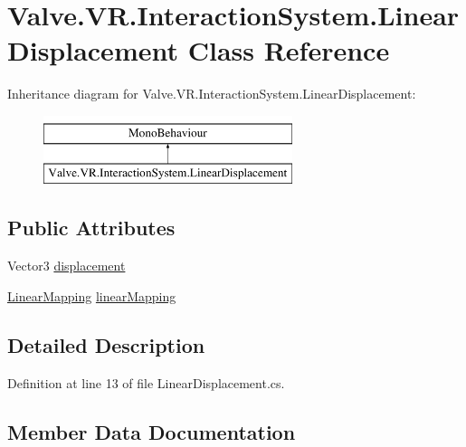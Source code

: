 \hypertarget{class_valve_1_1_v_r_1_1_interaction_system_1_1_linear_displacement}{}\section{Valve.\+V\+R.\+Interaction\+System.\+Linear\+Displacement Class Reference}
\label{class_valve_1_1_v_r_1_1_interaction_system_1_1_linear_displacement}
Inheritance diagram for Valve.\+V\+R.\+Interaction\+System.\+Linear\+Displacement\+:\begin{figure}[H]
\begin{center}
\leavevmode
\includegraphics[height=2.000000cm]{class_valve_1_1_v_r_1_1_interaction_system_1_1_linear_displacement}
\end{center}
\end{figure}
\subsection*{Public Attributes}
\begin{DoxyCompactItemize}
\item 
Vector3 \mbox{\hyperlink{class_valve_1_1_v_r_1_1_interaction_system_1_1_linear_displacement_a16d5c85c2d5af60e16f3b89466e2527a}{displacement}}
\item 
\mbox{\hyperlink{class_valve_1_1_v_r_1_1_interaction_system_1_1_linear_mapping}{Linear\+Mapping}} \mbox{\hyperlink{class_valve_1_1_v_r_1_1_interaction_system_1_1_linear_displacement_ab9cbfa64032477d68ee302a6f1184430}{linear\+Mapping}}
\end{DoxyCompactItemize}


\subsection{Detailed Description}


Definition at line 13 of file Linear\+Displacement.\+cs.



\subsection{Member Data Documentation}
\mbox{\label{class_valve_1_1_v_r_1_1_interaction_system_1_1_linear_displacement_a16d5c85c2d5af60e16f3b89466e2527a}} 
